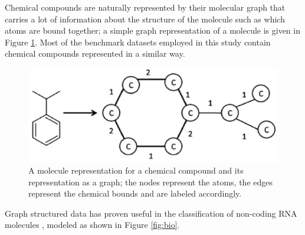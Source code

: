 Chemical compounds are naturally represented by their molecular graph that carries
a lot of information about the structure of the molecule such as which atoms are
bound together; a simple graph representation of a molecule is given in Figure \ref{fig:chem}.
Most of the benchmark datasets employed in this study contain chemical compounds
represented in a similar way.

\begin{figure}[ht]
    \centering
    \includegraphics[scale=0.4]{Figures/chcomp}
    \caption{A molecule representation for a chemical compound and its representation
    as a graph; the nodes represent the atoms, the edges represent the chemical bounds and
    are labeled accordingly.}
    \label{fig:chem}
\end{figure}

Graph structured data has proven useful in the classification of non-coding RNA
molecules \cite{nnavarin, conf/psb/KarklinMH05}, modeled as shown in Figure \ref{fig:bio}.

